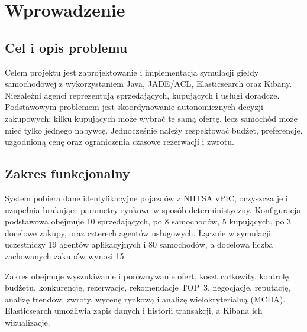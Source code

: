 \documentclass[a4paper,11pt]{uzreport}
\date{2026}
\author{Olaf Bykowski\\\texttt{109217@stud.uz.zgora.pl}}
\begin{document}
\maketitle
\tableofcontents
\clearpage

\section{Wprowadzenie}
\subsection{Cel i opis problemu}
Celem projektu jest zaprojektowanie i implementacja symulacji giełdy
samochodowej z wykorzystaniem Java, JADE/ACL, Elasticsearch oraz Kibany.
Niezależni agenci reprezentują sprzedających, kupujących i usługi doradcze.
Podstawowym problemem jest skoordynowanie autonomicznych decyzji zakupowych:
kilku kupujących może wybrać tę samą ofertę, lecz samochód może mieć tylko
jednego nabywcę. Jednocześnie należy respektować budżet, preferencje,
uzgodnioną cenę oraz ograniczenia czasowe rezerwacji i zwrotu.

\subsection{Zakres funkcjonalny}
System pobiera dane identyfikacyjne pojazdów z NHTSA vPIC, oczyszcza je
i uzupełnia brakujące parametry rynkowe w sposób deterministyczny.
Konfiguracja podstawowa obejmuje 10 sprzedających, po 8 samochodów,
5 kupujących, po 3 docelowe zakupy, oraz czterech agentów usługowych.
Łącznie w symulacji uczestniczy 19 agentów aplikacyjnych i 80 samochodów,
a docelowa liczba zachowanych zakupów wynosi 15.

Zakres obejmuje wyszukiwanie i porównywanie ofert, koszt całkowity,
kontrolę budżetu, konkurencję, rezerwacje, rekomendacje TOP~3,
negocjacje, reputację, analizę trendów, zwroty, wycenę rynkową
i analizę wielokryterialną (MCDA). Elasticsearch umożliwia zapis danych
i historii transakcji, a Kibana ich wizualizację.
\end{document}
